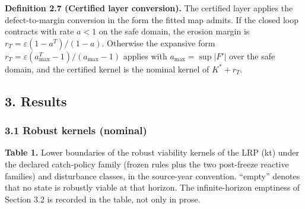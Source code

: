 \documentclass[11pt]{article}
\begin{document}
\textbf{Definition 2.7 (Certified layer conversion).} The certified
layer applies the defect-to-margin conversion in the form the fitted map
admits. If the closed loop contracts with rate \(a < 1\) on the safe
domain, the erosion margin is \(r_T = \varepsilon(1-a^T)/(1-a)\).
Otherwise the expansive form
\(r_T = \varepsilon(a_{\max}^T - 1)/(a_{\max} - 1)\) applies with
\(a_{\max} = \sup|F'|\) over the safe domain, and the certified kernel
is the nominal kernel of \(K^* + r_T\).

\subsection{3. Results}\label{results}

\subsubsection{3.1 Robust kernels
(nominal)}\label{robust-kernels-nominal}

\textbf{Table 1.} Lower boundaries of the robust viability kernels of
the LRP (kt) under the declared catch-policy family (frozen rules plus
the two post-freeze reactive families) and disturbance classes, in the
source-year convention. ``empty'' denotes that no state is robustly
viable at that horizon. The infinite-horizon emptiness of Section 3.2 is
recorded in the table, not only in prose.
\end{document}
